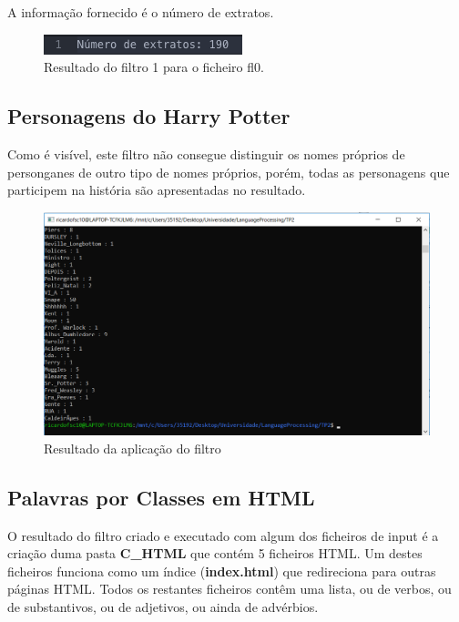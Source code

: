 \documentclass[11pt,a4paper]{report}
\begin{document}
A informação fornecido é o número de extratos.

\begin{figure}[H]
\centering
\includegraphics[scale=0.7]{testes1.png}
\caption{Resultado do filtro 1 para o ficheiro fl0.}
\label{img:testes1}
\end{figure}

\newpage

\subsection{Personagens do Harry Potter}

Como é visível, este filtro não consegue distinguir os nomes próprios de personganes de outro tipo de nomes próprios, porém, todas as personagens que participem na história são apresentadas no resultado.

\begin{figure}[H]
\centering
\includegraphics[scale=0.7]{resultadoharry.png}
\caption{Resultado da aplicação do filtro}
\label{img:resultadoharry}
\end{figure}


\subsection{Palavras por Classes em HTML}

O resultado do filtro criado e executado com algum dos ficheiros de input é a criação duma pasta \textbf{C\_HTML} que contém 5 ficheiros HTML. Um destes ficheiros funciona como um índice (\textbf{index.html}) que redireciona para outras páginas HTML. Todos os restantes ficheiros contêm uma lista, ou de verbos, ou de substantivos, ou de adjetivos, ou ainda de advérbios.
\end{document}
